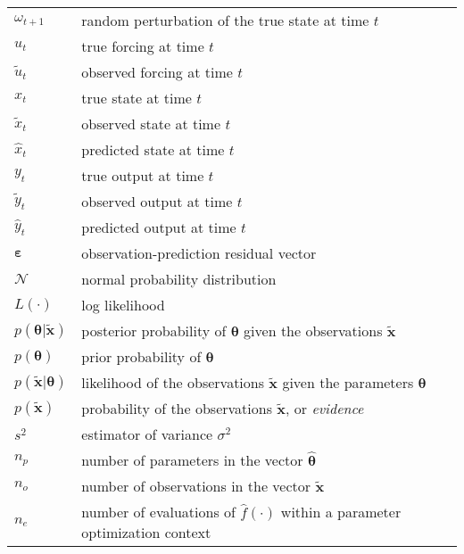 \begin{center}
\begin{longtable}{lp{10cm}}
$\omega_{t+1}$&random perturbation of the true state at time $t$\\
$u_t$&true forcing at time $t$\\
$\tilde{u}_t$&observed forcing at time $t$\\
$x_t$&true state at time $t$\\
$\tilde{x}_t$&observed state at time $t$\\
$\hat{x}_t$&predicted state at time $t$\\
$y_t$&true output at time $t$\\
$\tilde{y}_t$&observed output at time $t$\\
$\hat{y}_t$&predicted output at time $t$\\
$\boldsymbol\varepsilon$&observation-prediction residual vector\\
$\mathcal{N}$&normal probability distribution\\
$L(\cdot{})$&log likelihood\\
$p(\boldsymbol\theta|\tilde{\mathbf{x}})$&posterior probability of $\boldsymbol{\theta}$ given the observations $\tilde{\mathbf{x}}$\\
$p(\boldsymbol\theta)$&prior probability of $\boldsymbol{\theta}$\\
$p(\tilde{\mathbf{x}}|\boldsymbol\theta)$&likelihood of the observations $\tilde{\mathbf{x}}$ given the parameters $\boldsymbol{\theta}$\\
$p(\tilde{\mathbf{x}})$&probability of the observations $\tilde{\mathbf{x}}$, or \textit{evidence}\\
$s^2$&estimator of variance $\sigma^2$\\
$n_p$&number of parameters in the vector $\hat{\boldsymbol{\theta}}$\\
$n_o$&number of observations in the vector $\tilde{\mathbf{x}}$\\
$n_e$&number of evaluations of $\hat{f}(\cdot{})$ within a parameter optimization context\\
\end{longtable}
\end{center}

